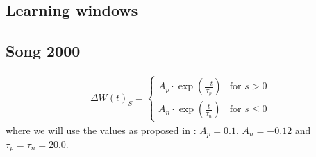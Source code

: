 
\subsection{Learning windows}



\subsection{Song 2000}
\begin{align}
\Delta W(t)_S =
\begin{cases}
A_{p} \cdot \exp \left(\frac{-t}{\tau_p}\right) & \text{for } s > 0 \\
A_{n} \cdot \exp \left(\frac{t}{\tau_n}\right)  & \text{for } s \leq 0
\end{cases} \label{eq:learningwindowKempter1999}
\end{align}
where we will use the values as proposed in \cite{ChrolCannon2012}: $A_p = 0.1$, $A_n = -0.12$ and $\tau_p = \tau_n = 20.0$.

